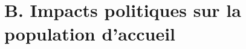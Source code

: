 \documentclass[xcolor=dvipsnames, aspectratio=169]{beamer}
\begin{document}
% 
%












\section{B. Impacts politiques sur la population d'accueil}
\end{document}
